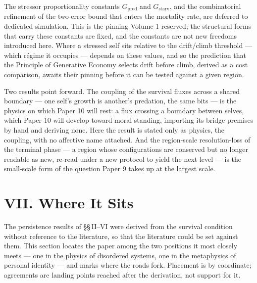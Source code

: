 \documentclass[11pt,oneside]{report}
\theoremstyle{definition}
\theoremstyle{remark}
\begin{document}
The stressor proportionality constants \ensuremath{G_{\mathrm{pred}}} and \ensuremath{G_{\mathrm{starv}}}, and the combinatorial refinement of the two-error bound that enters the mortality rate, are deferred to dedicated simulation. This is the pinning Volume 1 reserved; the structural forms that carry these constants are fixed, and the constants are not new freedoms introduced here. Where a stressed self sits relative to the drift/climb threshold --- which r\'egime it occupies --- depends on these values, and so the prediction that the Principle of Generative Economy selects drift before climb, derived as a cost comparison, awaits their pinning before it can be tested against a given region.

Two results point forward. The coupling of the survival fluxes across a shared boundary --- one self's growth is another's predation, the same bits --- is the physics on which Paper 10 will rest: a flux crossing a boundary between selves, which Paper 10 will develop toward moral standing, importing its bridge premises by hand and deriving none. Here the result is stated only as physics, the coupling, with no affective name attached. And the region-scale resolution-loss of the terminal phase --- a region whose configurations are conserved but no longer readable as new, re-read under a new protocol to yield the next level --- is the small-scale form of the question Paper 9 takes up at the largest scale.

\section*{VII. Where It Sits}

The persistence results of \S\S\,II--VI were derived from the survival condition without reference to the literature, so that the literature could be set against them. This section locates the paper among the two positions it most closely meets --- one in the physics of disordered systems, one in the metaphysics of personal identity --- and marks where the roads fork. Placement is by coordinate; agreements are landing points reached after the derivation, not support for it.
\end{document}
